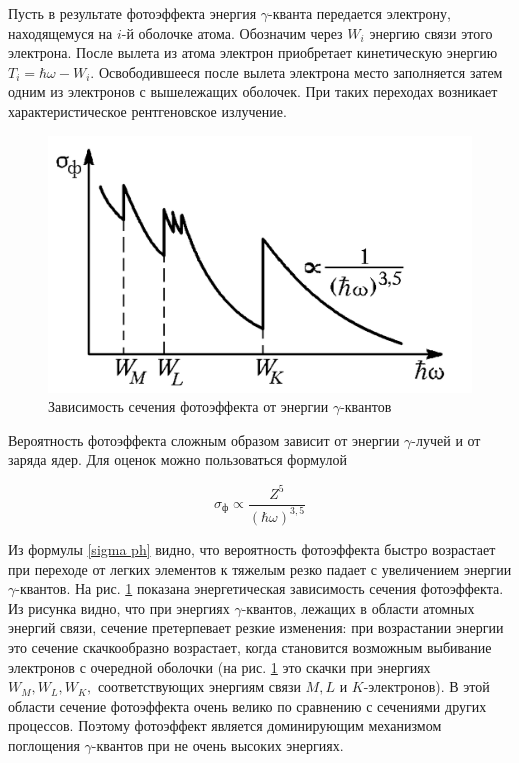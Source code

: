 \documentclass[12pt]{kiarticle} %
\newcommand{\ga}{\ensuremath{\gamma}}
\begin{document}
	Пусть в результате фотоэффекта энергия \ga-кванта передается
	электрону, находящемуся на $ i $-й оболочке атома. Обозначим через $ W_i $
	энергию связи этого электрона. После вылета из атома электрон приобретает кинетическую энергию $ T_i = \hbar \omega - W_i $.
	Освободившееся после вылета электрона место заполняется затем
	одним из электронов с вышележащих оболочек. При таких переходах
	возникает характеристическое рентгеновское излучение.
	
	\begin{figure}
		\includegraphics[width=\linewidth]{photo}
		\caption{Зависимость сечения фотоэффекта от энергии \ga-квантов}
		\label{ris photo}
	\end{figure}
	
	Вероятность фотоэффекта сложным образом зависит от энергии
	\ga-лучей и от заряда ядер. Для оценок можно пользоваться формулой
	
	\begin{equation}\label{sigma ph}
	\sigma_ф \propto \dfrac{Z^5}{(\hbar\omega)^{3,5}}
	\end{equation}
	
	Из формулы \eqref{sigma ph} видно, что вероятность фотоэффекта быстро возрастает при переходе от легких элементов к тяжелым резко падает с увеличением энергии \ga-квантов. На рис. \ref{ris photo} показана энергетическая зависимость сечения фотоэффекта. Из рисунка видно, что при энергиях \ga-квантов, лежащих в области атомных энергий связи, сечение претерпевает резкие изменения: при возрастании энергии это сечение скачкообразно возрастает, когда становится возможным выбивание электронов с очередной оболочки (на рис. \ref{ris photo} это скачки при энергиях $ W_M, W_L, W_K, $ соответствующих энергиям связи $ M, L $  и $ K $-электронов). В этой области сечение фотоэффекта очень велико по сравнению с сечениями других процессов. Поэтому фотоэффект является доминирующим механизмом поглощения \ga-квантов при не очень высоких энергиях.
	
\end{document}
